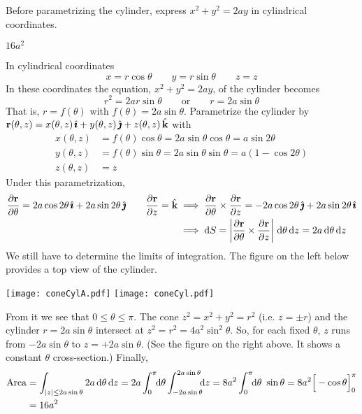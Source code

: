 \begin{hint}
Before parametrizing the cylinder, express
$x^2+y^2=2ay$ in cylindrical coordinates. 
\end{hint}

\begin{answer} 
$16a^2$
\end{answer}

\begin{solution} 
In cylindrical coordinates
\begin{equation*}
x=r\cos\theta\qquad
y=r\sin\theta\qquad
z=z
\end{equation*}
In these coordinates the equation, $x^2+y^2=2ay$, of the cylinder
becomes
\begin{equation*}
r^2=2ar\sin\theta\qquad\text{or}\qquad r=2a\sin\theta
\end{equation*}
That is, $r=f(\theta)$ with $f(\theta) =2a\sin\theta$.
Parametrize the cylinder by 
$\mathbf{r}(\theta,z) = x(\theta,z)\,\hat{\pmb{\imath}} + y(\theta,z)\,\hat{\pmb{\jmath}} + z(\theta,z)\,\hat{\mathbf{k}}$
with
\begin{align*}
x(\theta,z)&=f(\theta)\cos\theta=2a\sin\theta\cos\theta=a\sin2\theta\\
y(\theta,z)&=f(\theta)\sin\theta=2a\sin\theta\sin\theta=a(1-\cos2\theta)\\
z(\theta,z)&=z
\end{align*}
Under this parametrization,
\begin{align*}
\pdiff{\vr}{\theta}=2a\cos2\theta\,\hi+2a\sin2\theta\,\hj\qquad
\pdiff{\vr}{z}=\hk
&\implies \pdiff{\vr}{\theta}\times\pdiff{\vr}{z}
=-2a\cos2\theta\,\hj+2a\sin2\theta\,\hi \\
&\implies \dee{S}=\left|\pdiff{\vr}{\theta}\times\pdiff{\vr}{z}\right|\,
                         \dee{\theta}\,\dee{z}
                 =2a\,\dee{\theta}\,\dee{z}
\end{align*}
We still have to determine the limits of integration.
The figure on the left below provides a top view of the cylinder.
\begin{center}
          \texttt{[image: coneCylA.pdf]}\qquad\qquad
          \texttt{[image: coneCyl.pdf]}
\end{center}
From it we see that $0\le\theta\le\pi$.
The cone $z^2=x^2+y^2=r^2$ (i.e. $z=\pm r$)
and the cylinder $r=2a\sin\theta$ intersect at
$z^2=r^2=4a^2\sin^2\theta$. 
So, for each fixed $\theta$, $z$ runs from $-2a\sin\theta$ to $z=+2a\sin\theta$.
(See the figure on the right above. It shows a constant $\theta$
cross-section.) Finally,
\begin{align*}
{\rm Area} &= \int_{|z|\le 2a\sin\theta}2a\,\mathrm{d}\theta\,\mathrm{d}z
=2a\int_0^\pi \!\!\mathrm{d}\theta\int_{-2a\sin\theta}^{2a\sin\theta} \!\!\!\mathrm{d}z
=8a^2\int_0^\pi \!\!\mathrm{d}\theta\ \sin\theta
=8a^2\Big[-\cos\theta\Big]_0^\pi \\
&=16a^2
\end{align*}
\end{solution}

